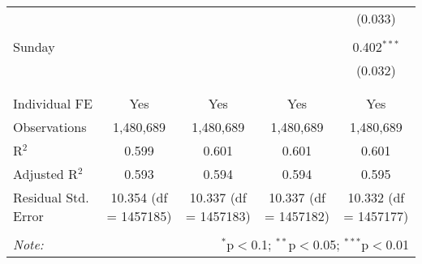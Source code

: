 \documentclass[
]{article}
\begin{document}
\begin{table}[!htbp]
{\begin{tabular}{@{\extracolsep{5pt}}lcccc}
  &  &  &  & (0.033) \\ 
  & & & & \\ 
 Sunday &  &  &  & 0.402$^{***}$ \\ 
  &  &  &  & (0.032) \\ 
  & & & & \\ 
\hline \\[-1.8ex] 
Individual FE & Yes & Yes & Yes & Yes \\ 
Observations & 1,480,689 & 1,480,689 & 1,480,689 & 1,480,689 \\ 
R$^{2}$ & 0.599 & 0.601 & 0.601 & 0.601 \\ 
Adjusted R$^{2}$ & 0.593 & 0.594 & 0.594 & 0.595 \\ 
Residual Std. Error & 10.354 (df = 1457185) & 10.337 (df = 1457183) & 10.337 (df = 1457182) & 10.332 (df = 1457177) \\ 
\hline 
\hline \\[-1.8ex] 
\textit{Note:}  & \multicolumn{4}{r}{$^{*}$p$<$0.1; $^{**}$p$<$0.05; $^{***}$p$<$0.01} \\ 
\end{tabular}
} 
\end{table} 
\newpage
\end{document}
